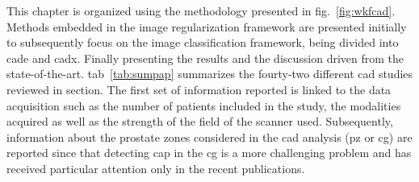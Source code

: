 


This chapter is organized using the methodology presented in \acs{fig}.~\ref{fig:wkfcad}.
Methods embedded in the image regularization framework are presented initially to subsequently focus on the image classification framework, being divided into \ac{cade} and \ac{cadx}.
Finally presenting the results and the discussion driven from the state-of-the-art.
\Acl{tab}~\ref{tab:sumpap} summarizes the fourty-two different \ac{cad} studies reviewed in section.
The first set of information reported is linked to the data acquisition such as the number of patients included in the study, the modalities acquired as well as the strength of the field of the scanner used.
Subsequently, information about the prostate zones considered in the \ac{cad} analysis (\ac{pz} or \ac{cg}) are reported since that detecting \ac{cap} in the \ac{cg} is a more challenging problem and has received particular attention only in the recent publications.






